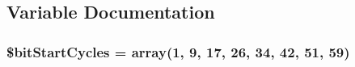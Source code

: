 \subsection{Variable Documentation}
\hypertarget{usbdrvasm128_8inc_a54b8fd7c4098cdf9f73bd9e5f27d41c8}{
\subsubsection[{\$bit\-Start\-Cycles}]{\setlength{\rightskip}{0pt plus 5cm}\$bit\-Start\-Cycles = array(1, 9, 17, 26, 34, 42, 51, 59)}}\label{usbdrvasm128_8inc_a54b8fd7c4098cdf9f73bd9e5f27d41c8}
